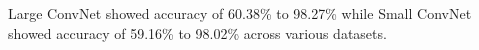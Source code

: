 Large ConvNet showed accuracy of 60.38\% to 98.27\% while Small ConvNet showed accuracy of 59.16\% to 98.02\% across various datasets.
